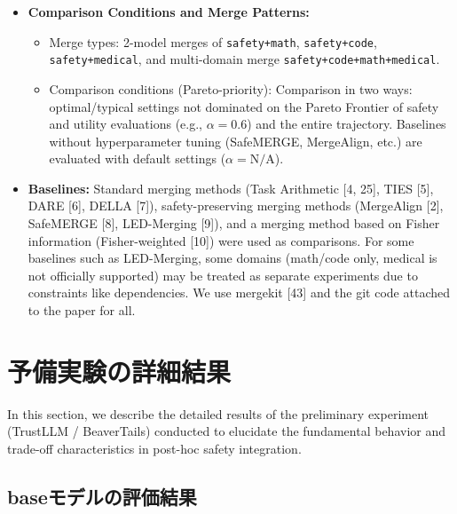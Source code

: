 \documentclass{article}
\begin{document}
\begin{itemize}
\begin{itemize}
        \item To execute the Pareto Frontier search across numerous methods, hyperparameters, and multiple seeds at a realistic computational cost, the number of evaluation data points is capped at 320 cases.
    \end{itemize}
    \item \textbf{Comparison Conditions and Merge Patterns:}
    \begin{itemize}
        \item Merge types:
        2-model merges of \texttt{safety+math}, \texttt{safety+code}, \texttt{safety+medical}, and multi-domain merge \texttt{safety+code+math+medical}.
        \item Comparison conditions (Pareto-priority):
        Comparison in two ways: optimal/typical settings not dominated on the Pareto Frontier of safety and utility evaluations (e.g., $\alpha=0.6$) and the entire trajectory. Baselines without hyperparameter tuning (SafeMERGE, MergeAlign, etc.) are evaluated with default settings ($\alpha=\mathrm{N/A}$).
    \end{itemize}
    \item \textbf{Baselines:}
    Standard merging methods (Task Arithmetic [4, 25], TIES [5], DARE [6], DELLA [7]), safety-preserving merging methods (MergeAlign [2], SafeMERGE [8], LED-Merging [9]), and a merging method based on Fisher information (Fisher-weighted [10]) were used as comparisons. For some baselines such as LED-Merging, some domains (math/code only, medical is not officially supported) may be treated as separate experiments due to constraints like dependencies. We use mergekit [43] and the git code attached to the paper for all.
\end{itemize}


\section{予備実験の詳細結果}

In this section, we describe the detailed results of the preliminary experiment (TrustLLM / BeaverTails) conducted to elucidate the fundamental behavior and trade-off characteristics in post-hoc safety integration.

\subsection{baseモデルの評価結果}
\end{document}
